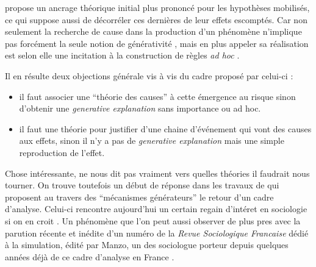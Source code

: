 \textcite{Conte2007} propose un ancrage théorique initial plus prononcé pour les hypothèses mobilisés, ce qui suppose aussi de décorréler ces dernières de leur effets escomptés. Car non seulement la recherche de cause dans la production d'un phénomène n'implique pas forcément la seule notion de générativité , mais en plus appeler sa réalisation est selon elle une incitation à la construction de règles \textit{ad hoc} .
 
Il en résulte deux objections générale vis à vis du cadre proposé par celui-ci : 
\begin{itemize}
\item il faut associer une \enquote{théorie des causes} à cette émergence au risque sinon d'obtenir une \textit{generative explanation} sans importance ou ad hoc.
\item il faut une théorie pour justifier d'une chaine d'événement qui vont des causes aux effets, sinon il n'y a pas de \textit{generative explanation} mais une simple reproduction de l'effet.
\end{itemize}


Chose intéressante, \textcite{Conte2007} ne nous dit pas vraiment vers quelles théories il faudrait nous tourner. On trouve toutefois un début de réponse dans les travaux de \textcites{Hedstrom2010, Manzo2007, Elsenbroich2012} qui proposent au travers des \enquote{mécanismes générateurs} le retour d'un cadre d'analyse. Celui-ci rencontre aujourd'hui un certain regain d'intéret en sociologie si on en croit \textcites{Berger2010, Hedstrom2010}. Un phénomène que l'on peut aussi observer de plus pres avec la parution récente et inédite  d'un numéro de la \textit{Revue Sociologique Francaise} dédié à la simulation, édité par Manzo, un des sociologue porteur depuis quelques années déjà de ce cadre d'analyse en France \autocite{Manzo2005, Manzo2007}.

